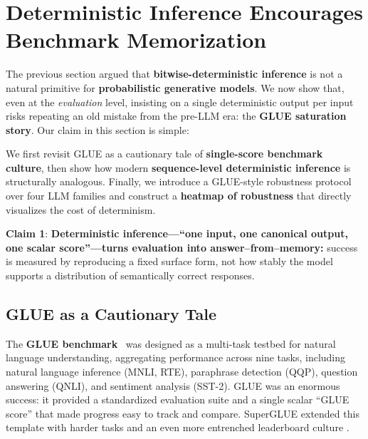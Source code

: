 



\section{Deterministic Inference Encourages Benchmark Memorization}
\label{sec:glue-memorization}

The previous section argued that \textbf{bitwise-deterministic inference} is not a natural
primitive for \textbf{probabilistic generative models}. We now show that, even at the
\emph{evaluation} level, insisting on a single deterministic output per input risks
repeating an old mistake from the pre-LLM era: the \textbf{GLUE saturation story}.
Our claim in this section is simple:


We first revisit GLUE as a cautionary tale of \textbf{single-score benchmark culture},
then show how modern \textbf{sequence-level deterministic inference} is structurally
analogous. Finally, we introduce a GLUE-style robustness protocol over four LLM
families and construct a \textbf{heatmap of robustness} that directly visualizes
the cost of determinism.

\begin{tcolorbox}[colback=gray!5,colframe=black!60,sharp corners]
\textbf{Claim 1}:
\textbf{Deterministic inference—``one input, one canonical output, one scalar score''—turns evaluation into answer–from–memory:} success is measured by reproducing a fixed surface form, not how stably the model supports a distribution of semantically correct responses.
\end{tcolorbox}


\subsection{GLUE as a Cautionary Tale}
\label{subsec:glue-history}

The \textbf{GLUE benchmark}~\cite{wang2018glue} was designed as a multi-task testbed
for natural language understanding, aggregating performance across nine tasks,
including natural language inference (MNLI, RTE), paraphrase detection (QQP),
question answering (QNLI), and sentiment analysis (SST-2). GLUE was an enormous
success: it provided a standardized evaluation suite and a single scalar ``GLUE
score'' that made progress easy to track and compare. SuperGLUE extended this
template with harder tasks and an even more entrenched leaderboard culture
\cite{wang2019glue}.

